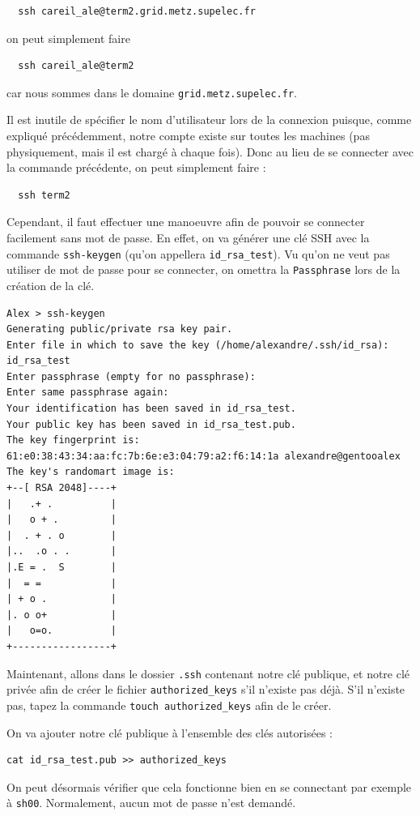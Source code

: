 \begin{verbatim}
  ssh careil_ale@term2.grid.metz.supelec.fr
\end{verbatim}
 on peut simplement faire
\begin{verbatim}
  ssh careil_ale@term2
\end{verbatim}

car nous sommes dans le domaine \texttt{grid.metz.supelec.fr}.

 Il est inutile de spécifier le nom d'utilisateur lors de la connexion puisque, comme expliqué précédemment, notre compte existe sur toutes les machines (pas physiquement, mais il est chargé à chaque fois). Donc au lieu de se connecter avec la commande précédente, on peut simplement faire :
 
\begin{verbatim}
  ssh term2
\end{verbatim}

Cependant, il faut effectuer une manoeuvre afin de pouvoir se connecter facilement sans mot de passe. En effet, on va générer une clé SSH avec la commande \texttt{ssh-keygen} (qu'on appellera \texttt{id\_rsa\_test}). Vu qu'on ne veut pas utiliser de mot de passe pour se connecter, on omettra la \texttt{Passphrase} lors de la création de la clé.

\begin{verbatim}
Alex > ssh-keygen
Generating public/private rsa key pair.
Enter file in which to save the key (/home/alexandre/.ssh/id_rsa): id_rsa_test
Enter passphrase (empty for no passphrase): 
Enter same passphrase again: 
Your identification has been saved in id_rsa_test.
Your public key has been saved in id_rsa_test.pub.
The key fingerprint is:
61:e0:38:43:34:aa:fc:7b:6e:e3:04:79:a2:f6:14:1a alexandre@gentooalex
The key's randomart image is:
+--[ RSA 2048]----+
|   .+ .          |
|   o + .         |
|  . + . o        |
|..  .o . .       |
|.E = .  S        |
|  = =            |
| + o .           |
|. o o+           |
|   o=o.          |
+-----------------+
\end{verbatim}

\par Maintenant, allons dans le dossier \texttt{.ssh} contenant notre clé publique, et notre clé privée afin de créer le fichier \texttt{authorized\_keys} s'il n'existe pas déjà. S'il n'existe pas, tapez la commande \texttt{touch authorized\_keys} afin de le créer.

\par On va ajouter notre clé publique à l'ensemble des clés autorisées :
\begin{verbatim}
cat id_rsa_test.pub >> authorized_keys
\end{verbatim}
\par On peut désormais vérifier que cela fonctionne bien en se connectant par exemple à \texttt{sh00}. Normalement, aucun mot de passe n'est demandé. 

